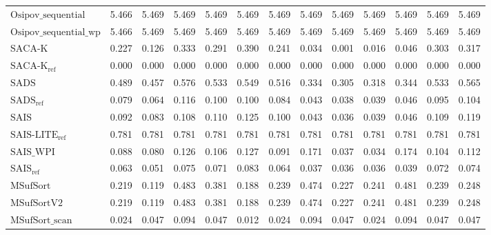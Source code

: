 \begin{table}[ht]
{\begin{tabular}{lrrrrrrrrrrrr}
    $\text{Osipov\_sequential}$ & {\color{red}5.466} & {\color{red}5.469} & {\color{red}5.469} & {\color{red}5.469} & {\color{red}5.469} & {\color{red}5.469} & {\color{red}5.469} & {\color{red}5.469} & {\color{red}5.469} & {\color{red}5.469} & {\color{red}5.469} & {\color{red}5.469} \\
    $\text{Osipov\_sequential\_wp}$ & {\color{red}5.466} & {\color{red}5.469} & {\color{red}5.469} & {\color{red}5.469} & {\color{red}5.469} & {\color{red}5.469} & {\color{red}5.469} & {\color{red}5.469} & {\color{red}5.469} & {\color{red}5.469} & {\color{red}5.469} & {\color{red}5.469} \\
    $\text{SACA-K}$ & 0.227 & 0.126 & 0.333 & 0.291 & 0.390 & 0.241 & 0.034 & 0.001 & 0.016 & 0.046 & 0.303 & 0.317 \\
    $\text{SACA-K}_{\text{ref}}$ & {\color{green!60!black}0.000} & {\color{green!60!black}0.000} & {\color{green!60!black}0.000} & {\color{green!60!black}0.000} & {\color{green!60!black}0.000} & {\color{green!60!black}0.000} & {\color{green!60!black}0.000} & {\color{green!60!black}0.000} & {\color{green!60!black}0.000} & {\color{green!60!black}0.000} & {\color{green!60!black}0.000} & {\color{green!60!black}0.000} \\
    $\text{SADS}$ & 0.489 & 0.457 & 0.576 & 0.533 & 0.549 & 0.516 & 0.334 & 0.305 & 0.318 & 0.344 & 0.533 & 0.565 \\
    $\text{SADS}_{\text{ref}}$ & 0.079 & 0.064 & 0.116 & 0.100 & 0.100 & 0.084 & 0.043 & 0.038 & 0.039 & 0.046 & 0.095 & 0.104 \\
    $\text{SAIS}$ & 0.092 & 0.083 & 0.108 & 0.110 & 0.125 & 0.100 & 0.043 & 0.036 & 0.039 & 0.046 & 0.109 & 0.119 \\
    $\text{SAIS-LITE}_{\text{ref}}$ & 0.781 & 0.781 & 0.781 & 0.781 & 0.781 & 0.781 & 0.781 & 0.781 & 0.781 & 0.781 & 0.781 & 0.781 \\
    $\text{SAIS\_WPI}$ & 0.088 & 0.080 & 0.126 & 0.106 & 0.127 & 0.091 & 0.171 & 0.037 & 0.034 & 0.174 & 0.104 & 0.112 \\
    $\text{SAIS}_{\text{ref}}$ & 0.063 & 0.051 & 0.075 & 0.071 & 0.083 & 0.064 & 0.037 & 0.036 & 0.036 & 0.039 & 0.072 & 0.074 \\
    $\text{MSufSort}$ & 0.219 & 0.119 & 0.483 & 0.381 & 0.188 & 0.239 & 0.474 & 0.227 & 0.241 & 0.481 & 0.239 & 0.248 \\
    $\text{MSufSortV2}$ & 0.219 & 0.119 & 0.483 & 0.381 & 0.188 & 0.239 & 0.474 & 0.227 & 0.241 & 0.481 & 0.239 & 0.248 \\
    $\text{MSufSort\_scan}$ & 0.024 & 0.047 & 0.094 & 0.047 & 0.012 & 0.024 & 0.094 & 0.047 & 0.024 & 0.094 & 0.047 & 0.047 \\

\end{tabular}}
\end{table}

